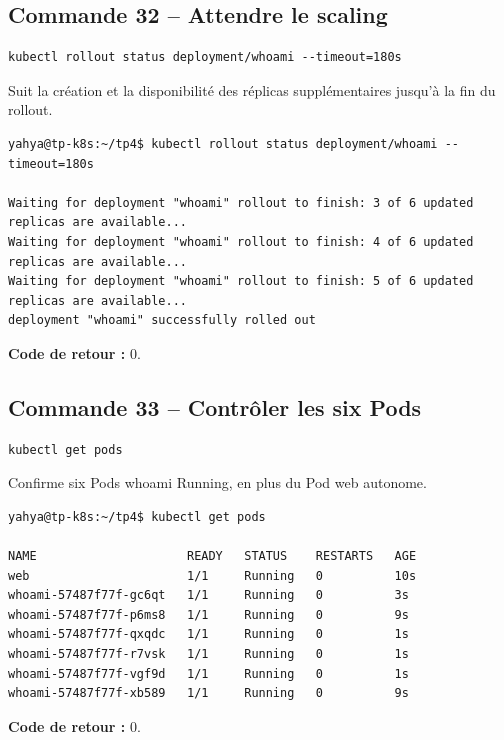 \documentclass[11pt,a4paper]{article}
\begin{document}
\subsection{Commande 32 -- Attendre le scaling}
\begin{lstlisting}
kubectl rollout status deployment/whoami --timeout=180s
\end{lstlisting}
Suit la création et la disponibilité des réplicas supplémentaires jusqu’à la fin du rollout.
\begin{tcolorbox}[terminal,title={Ubuntu / WSL2 -- Commande 32 -- rendu reconstitué}]
\begin{Verbatim}[fontsize=\scriptsize,breaklines=true,breakanywhere=true,breaksymbolleft={},breaksymbolright={}]
yahya@tp-k8s:~/tp4$ kubectl rollout status deployment/whoami --timeout=180s

Waiting for deployment "whoami" rollout to finish: 3 of 6 updated replicas are available...
Waiting for deployment "whoami" rollout to finish: 4 of 6 updated replicas are available...
Waiting for deployment "whoami" rollout to finish: 5 of 6 updated replicas are available...
deployment "whoami" successfully rolled out
\end{Verbatim}
\end{tcolorbox}
\textbf{Code de retour :} 0.

\subsection{Commande 33 -- Contrôler les six Pods}
\begin{lstlisting}
kubectl get pods
\end{lstlisting}
Confirme six Pods whoami Running, en plus du Pod web autonome.
\begin{tcolorbox}[terminal,title={Ubuntu / WSL2 -- Commande 33 -- rendu reconstitué}]
\begin{Verbatim}[fontsize=\scriptsize,breaklines=true,breakanywhere=true,breaksymbolleft={},breaksymbolright={}]
yahya@tp-k8s:~/tp4$ kubectl get pods

NAME                     READY   STATUS    RESTARTS   AGE
web                      1/1     Running   0          10s
whoami-57487f77f-gc6qt   1/1     Running   0          3s
whoami-57487f77f-p6ms8   1/1     Running   0          9s
whoami-57487f77f-qxqdc   1/1     Running   0          1s
whoami-57487f77f-r7vsk   1/1     Running   0          1s
whoami-57487f77f-vgf9d   1/1     Running   0          1s
whoami-57487f77f-xb589   1/1     Running   0          9s
\end{Verbatim}
\end{tcolorbox}
\textbf{Code de retour :} 0.
\end{document}
